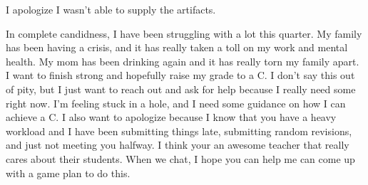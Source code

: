 \documentclass[
  letterpaper,
  DIV=11,
  numbers=noendperiod]{scrartcl}
\begin{document}
I apologize I wasn't able to supply the artifacts. ~

In complete candidness, I have been struggling with a lot this quarter.
My family has been having a crisis, and it has really taken a toll on my
work and mental health. My mom has been drinking again and it has really
torn my family apart. I want to finish strong and hopefully raise my
grade to a C. I don't say this out of pity, but I just want to reach out
and ask for help because I really need some right now. I'm feeling stuck
in a hole, and I need some guidance on how I can achieve a C. I also
want to apologize because I know that you have a heavy workload and I
have been submitting things late, submitting random revisions, and just
not meeting you halfway. I think your an awesome teacher that really
cares about their students. When we chat, I hope you can help me can
come up with a game plan to do this.
\end{document}
